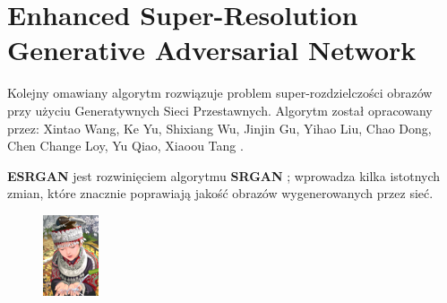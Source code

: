 \chapter{Enhanced Super-Resolution Generative Adversarial Network}

Kolejny omawiany algorytm rozwiązuje problem super-rozdzielczości obrazów przy użyciu Generatywnych Sieci Przestawnych. Algorytm został opracowany przez: Xintao Wang, Ke Yu, Shixiang Wu, Jinjin Gu, Yihao Liu,
Chao Dong, Chen Change Loy, Yu Qiao, Xiaoou Tang \cite{wang2018esrgan}.

\textbf{ESRGAN} jest rozwinięciem algorytmu \textbf{SRGAN} \cite{Ledig_2017_CVPR}; wprowadza kilka istotnych zmian, które znacznie poprawiają jakość obrazów wygenerowanych przez sieć.


\begin{figure}[ht]
    \centering
    \begin{minipage}[t]{0.4\linewidth}
        \includegraphics[width=\linewidth]{Rozdziały/02.Podstawy_teoretyczne/Obrazy/comic.png}

\end{minipage}
\end{figure}

